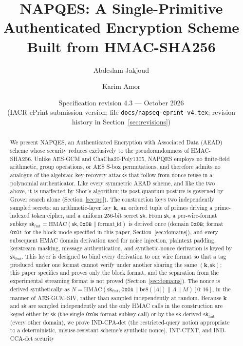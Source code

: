 \documentclass[11pt,a4paper]{article}
\title{\textbf{NAPQES: A Single-Primitive Authenticated Encryption Scheme\\
Built from HMAC-SHA256}}
\author[1]{Abdeslam Jakjoud}
\author[1]{Karim Amor}
\affil[1]{QAegis, France}
\date{Specification revision 4.3 --- October 2026\\
\small (IACR ePrint submission version; file
\texttt{docs/napseq-eprint-v4.tex}; revision history in
Section~\ref{sec:revisions})}
\begin{document}
\maketitle

\begin{abstract}
We present NAPQES, an Authenticated Encryption with Associated Data (AEAD)
scheme whose security reduces exclusively to the pseudorandomness of
HMAC-SHA256.  Unlike AES-GCM and ChaCha20-Poly1305, NAPQES employs no
finite-field arithmetic, group operations, or AES S-box permutations, and
therefore admits no analogue of the algebraic key-recovery attacks that
follow from nonce reuse in a polynomial authenticator. Like every
symmetric AEAD scheme, and like the two above, it is unaffected by Shor's
algorithm; its post-quantum posture is governed by Grover search alone
(Section~\ref{sec:pq}).  The construction keys two independently sampled
secrets: an
arithmetic-layer key $\mathbf{k}$, an ordered tuple of primes driving a
prime-indexed token cipher, and a uniform 256-bit secret $\mathsf{sk}$.
From $\mathsf{sk}$, a per-wire-format subkey
$\mathsf{sk}_{\mathrm{fmt}}=\mathrm{HMAC}(\mathsf{sk},
\texttt{0x0B}\|\mathrm{format\_id})$ is derived once (domain
$\texttt{0x0B}$; format $\texttt{0x01}$ for the block mode specified in
this paper, Section~\ref{sec:domains}), and every subsequent HMAC domain
derivation used for noise injection, plaintext padding, keystream
masking, message authentication, and synthetic-nonce derivation is keyed
by $\mathsf{sk}_{\mathrm{fmt}}$. This layer is designed to bind every derivation to
one wire format so that a tag produced under one format cannot verify
under another sharing the same $(\mathbf{k},\mathsf{sk})$; this paper
specifies and proves only the block format, and the separation from the
experimental streaming format is not proved (Section~\ref{sec:domains}). The nonce is
derived synthetically as
$N=\mathrm{HMAC}(\mathsf{sk}_{\mathrm{fmt}},\texttt{0x0A}\|\mathrm{be8}(|A|)\|A\|M)[0{:}16]$,
in
the manner of AES-GCM-SIV, rather than sampled independently at random.
Because $\mathbf{k}$ and $\mathsf{sk}$ are sampled independently and the
only HMAC calls in the construction are keyed either by $\mathsf{sk}$
(the single $\texttt{0x0B}$ format-subkey call) or by the
$\mathsf{sk}$-derived $\mathsf{sk}_{\mathrm{fmt}}$ (every other domain),
we prove IND-CPA-det (the
restricted-query notion appropriate to a deterministic, misuse-resistant
scheme's synthetic nonce), INT-CTXT, and IND-CCA-det security

\end{abstract}
\end{document}
